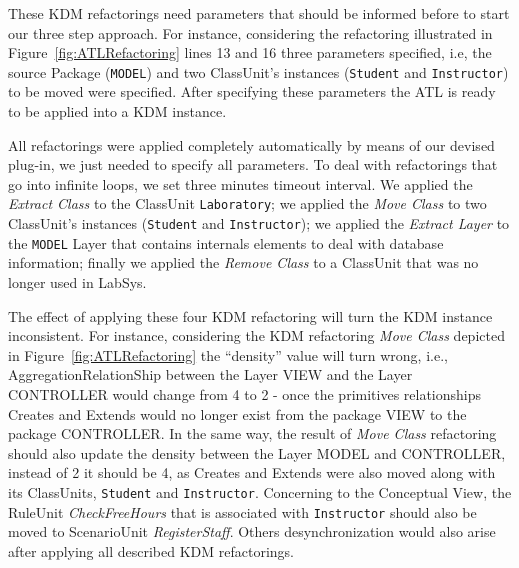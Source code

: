 These KDM refactorings need parameters that should be informed before to start our three step approach. For instance, considering the refactoring illustrated in Figure~\ref{fig:ATLRefactoring} lines 13 and 16 three parameters specified, i.e, the source Package (\texttt{MODEL}) and two ClassUnit's instances (\texttt{Student} and \texttt{Instructor}) to be moved were specified. %
After specifying these parameters the ATL is ready to be applied into a KDM instance.


All refactorings were applied completely automatically by means of our devised plug-in, we just needed to specify all parameters. To deal with refactorings that go into infinite loops, we set three minutes timeout interval. 
We applied the \textit{Extract Class} to the ClassUnit \texttt{Laboratory}; we applied the \textit{Move Class} to two ClassUnit's instances (\texttt{Student} and \texttt{Instructor}); we applied the \textit{Extract Layer} to the \texttt{MODEL} Layer that contains internals elements to deal with database information; finally we applied the \textit{Remove Class} to a ClassUnit that was no longer used in LabSys.

The effect of applying these four KDM refactoring will turn the KDM instance inconsistent. For instance, considering the KDM refactoring \textit{Move Class} depicted in Figure~\ref{fig:ATLRefactoring} the ``density'' value will turn wrong, i.e., AggregationRelationShip between
the Layer VIEW and the Layer CONTROLLER would
change from 4 to 2 - once the primitives relationships Creates
and Extends would no longer exist from the package VIEW
to the package CONTROLLER. In the same way, the result of \textit{Move Class} refactoring should also update the density between the Layer
MODEL and CONTROLLER, instead of 2 it should be 4, as
Creates and Extends were also moved along with its
ClassUnits, \texttt{Student} and \texttt{Instructor}. Concerning to the
Conceptual View, the RuleUnit \textit{CheckFreeHours} that is associated with
\texttt{Instructor} should also be moved to ScenarioUnit \textit{RegisterStaff}. Others desynchronization would also arise after applying all described KDM refactorings. 

